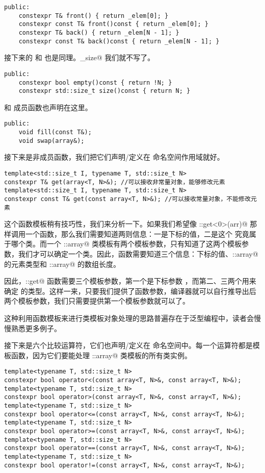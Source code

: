 \begin{lstlisting}
public:
    constexpr T& front() { return _elem[0]; }
    constexpr const T& front()const { return _elem[0]; }
    constexpr T& back() { return _elem[N - 1]; }
    constexpr const T& back()const { return _elem[N - 1]; }
\end{lstlisting}\par\pagebreak
接下来的 \lstinline@size@ 和 \lstinline@empty@ 也是同理。\lstinline@max_size@ 我们就不写了。
\begin{lstlisting}
public:
    constexpr bool empty()const { return !N; }
    constexpr std::size_t size()const { return N; }
\end{lstlisting}\par
\lstinline@fill@ 和 \lstinline@swap@ 成员函数也声明在这里。
\begin{lstlisting}
public:
    void fill(const T&);
    void swap(array&);
\end{lstlisting}\par
接下来是非成员函数，我们把它们声明/定义在 \lstinline@user@ 命名空间作用域就好。
\begin{lstlisting}
template<std::size_t I, typename T, std::size_t N>
constexpr T& get(array<T, N>&); //可以接收非常量对象，能够修改元素
template<std::size_t I, typename T, std::size_t N>
constexpr const T& get(const array<T, N>&); //可以接收常量对象，不能修改元素
\end{lstlisting}
这个函数模板稍有技巧性，我们来分析一下。如果我们希望像 \lstinline@user::get<0>(arr)@ 那样调用一个函数，那么我们需要知道两则信息：一是下标的值，二是这个 \lstinline@arr@ 究竟属于哪个类。而一个 \lstinline@user::array@ 类模板有两个模板参数，只有知道了这两个模板参数，我们才可以确定一个类。因此，\lstinline@get@ 函数需要知道三个信息：下标的值、\lstinline@user::array@ 的元素类型和 \lstinline@user::array@ 的数组长度。\par
因此，\lstinline@user::get@ 函数需要三个模板参数，第一个是下标参数 \lstinline@I@，而第二、三两个用来确定 \lstinline@arr@ 的类型。这样一来，只要我们提供了函数参数，编译器就可以自行推导出后两个模板参数，我们只需要提供第一个模板参数就可以了。\par
这种利用函数模板来进行类模板对象处理的思路普遍存在于泛型编程中，读者会慢慢熟悉更多例子。\par
接下来是六个比较运算符，它们也声明/定义在 \lstinline@user@ 命名空间中。每一个运算符都是模板函数，因为它们要能处理 \lstinline@user::array@ 类模板的所有类实例。
\begin{lstlisting}
template<typename T, std::size_t N>
constexpr bool operator<(const array<T, N>&, const array<T, N>&);
template<typename T, std::size_t N>
constexpr bool operator>(const array<T, N>&, const array<T, N>&);
template<typename T, std::size_t N>
constexpr bool operator<=(const array<T, N>&, const array<T, N>&);
template<typename T, std::size_t N>
constexpr bool operator>=(const array<T, N>&, const array<T, N>&);
template<typename T, std::size_t N>
constexpr bool operator==(const array<T, N>&, const array<T, N>&);
template<typename T, std::size_t N>
constexpr bool operator!=(const array<T, N>&, const array<T, N>&);
\end{lstlisting}\par\newpage
